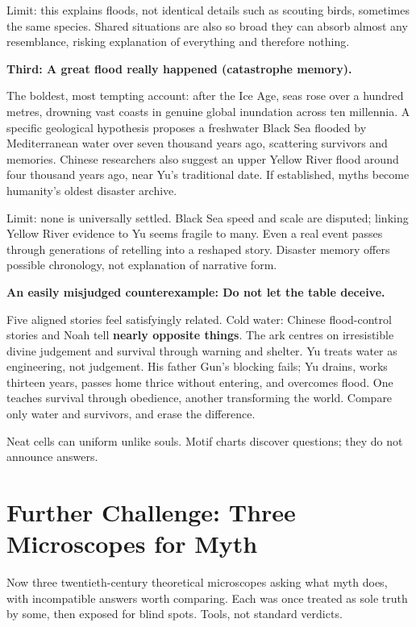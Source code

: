 Limit: this explains floods, not identical details such as scouting birds, sometimes the same species. Shared situations are also so broad they can absorb almost any resemblance, risking explanation of everything and therefore nothing.

\textbf{Third: A great flood really happened (catastrophe memory).}

The boldest, most tempting account: after the Ice Age, seas rose over a hundred metres, drowning vast coasts in genuine global inundation across ten millennia. A specific geological hypothesis proposes a freshwater Black Sea flooded by Mediterranean water over seven thousand years ago, scattering survivors and memories. Chinese researchers also suggest an upper Yellow River flood around four thousand years ago, near Yu's traditional date. If established, myths become humanity's oldest disaster archive.

Limit: none is universally settled. Black Sea speed and scale are disputed; linking Yellow River evidence to Yu seems fragile to many. Even a real event passes through generations of retelling into a reshaped story. Disaster memory offers possible chronology, not explanation of narrative form.

\textbf{An easily misjudged counterexample: Do not let the table deceive.}

Five aligned stories feel satisfyingly related. Cold water: Chinese flood-control stories and Noah tell \textbf{nearly opposite things}. The ark centres on irresistible divine judgement and survival through warning and shelter. Yu treats water as engineering, not judgement. His father Gun's blocking fails; Yu drains, works thirteen years, passes home thrice without entering, and overcomes flood. One teaches survival through obedience, another transforming the world. Compare only water and survivors, and erase the difference.

Neat cells can uniform unlike souls. Motif charts discover questions; they do not announce answers.

\section[Further Challenge: Three Myth Lenses]{Further Challenge: Three Microscopes for Myth}
Now three twentieth-century theoretical microscopes asking what myth does, with incompatible answers worth comparing. Each was once treated as sole truth by some, then exposed for blind spots. Tools, not standard verdicts.


